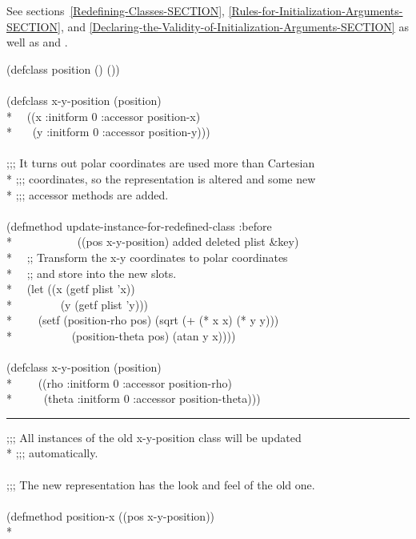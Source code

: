 \begin{defun}
See sections~\ref{Redefining-Classes-SECTION},
\ref{Rules-for-Initialization-Arguments-SECTION}, and
\ref{Declaring-the-Validity-of-Initialization-Arguments-SECTION} as well as
 and .
\begin{lisp}
(defclass position () ()) \\
\\
(defclass x-y-position (position) \\*
~~((x :initform 0 :accessor position-x) \\*
~~~(y :initform 0 :accessor position-y))) \\
\\
;;; It turns out polar coordinates are used more than Cartesian  \\*
;;; coordinates, so the representation is altered and some new \\*
;;; accessor methods are added. \\
\\
(defmethod update-instance-for-redefined-class :before \\*
~~~~~~~~~~~((pos x-y-position) added deleted plist \&key) \\*
~~;; Transform the x-y coordinates to polar coordinates \\*
~~;; and store into the new slots. \\*
~~(let ((x (getf plist 'x)) \\*
~~~~~~~~(y (getf plist 'y))) \\*
~~~~(setf (position-rho pos) (sqrt (+ (* x x) (* y y))) \\*
~~~~~~~~~~(position-theta pos) (atan y x)))) \\
\\
(defclass x-y-position (position) \\*
~~~~((rho :initform 0 :accessor position-rho) \\*
~~~~~(theta :initform 0 :accessor position-theta)))
\end{lisp}
\hrule width 0pt\relax
\begin{lisp}
;;; All instances of the old x-y-position class will be updated \\*
;;; automatically. \\
\\
;;; The new representation has the look and feel of the old one. \\
\\
(defmethod position-x ((pos x-y-position)) \\*

\end{lisp}
\end{defun}
